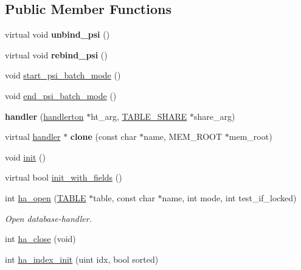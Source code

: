 \subsection*{Public Member Functions}
\begin{DoxyCompactItemize}
\item 
\mbox{\label{classhandler_a72cfeaceefd05a2f700c138c194770fc}} 
virtual void {\bfseries unbind\+\_\+psi} ()
\item 
\mbox{\label{classhandler_a1e335a403d8203854bc5b94111992b79}} 
virtual void {\bfseries rebind\+\_\+psi} ()
\item 
void \mbox{\hyperlink{classhandler_a6cadefb8724982848541e06a394917e8}{start\+\_\+psi\+\_\+batch\+\_\+mode}} ()
\item 
void \mbox{\hyperlink{classhandler_ab6a860cb6d6cb731416080acc8f179e0}{end\+\_\+psi\+\_\+batch\+\_\+mode}} ()
\item 
\mbox{\label{classhandler_a9ae8f7f7b4f67773b73906143238dc9f}} 
{\bfseries handler} (\mbox{\hyperlink{structhandlerton}{handlerton}} $\ast$ht\+\_\+arg, \mbox{\hyperlink{structTABLE__SHARE}{T\+A\+B\+L\+E\+\_\+\+S\+H\+A\+RE}} $\ast$share\+\_\+arg)
\item 
\mbox{\label{classhandler_a97fc340039f5cf37a26e7c3b53685794}} 
virtual \mbox{\hyperlink{classhandler}{handler}} $\ast$ {\bfseries clone} (const char $\ast$name, M\+E\+M\+\_\+\+R\+O\+OT $\ast$mem\+\_\+root)
\item 
void \mbox{\hyperlink{classhandler_ab1ad6edb66592b200a7c7ac0f947dc66}{init}} ()
\item 
virtual bool \mbox{\hyperlink{classhandler_a6b6facc9d1d0bda98c814660eaa9bad7}{init\+\_\+with\+\_\+fields}} ()
\item 
int \mbox{\hyperlink{classhandler_ab5e02829386929734724b143391e0a11}{ha\+\_\+open}} (\mbox{\hyperlink{structTABLE}{T\+A\+B\+LE}} $\ast$table, const char $\ast$name, int mode, int test\+\_\+if\+\_\+locked)
\begin{DoxyCompactList}\small\item\em Open database-\/handler. \end{DoxyCompactList}\item 
int \mbox{\hyperlink{classhandler_ae28824cdff2c1812e282463c908e84c2}{ha\+\_\+close}} (void)
\item 
int \mbox{\hyperlink{classhandler_a0af23462b249041a0db03c1c7139d76b}{ha\+\_\+index\+\_\+init}} (uint idx, bool sorted)

\end{DoxyCompactItemize}
